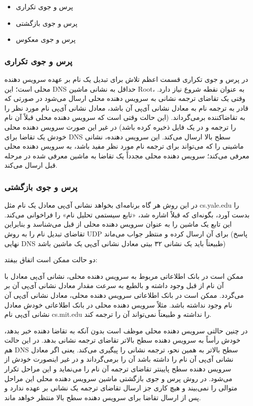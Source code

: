 \documentclass[12pt]{book}
\begin{document}
\begin{itemize}
	\item پرس و جوی تکراری 
	\item پرس و جوی بازگشتی 
	\item پرس و جوی معکوس 
\end{itemize}


\subsubsection{پرس و جوی تکراری}

در پرس و جوی تکراری قسمت اعظم تلاش برای تبدیل یک نام بر عهده سرویس دهنده محلی است؛ این DNS حداقل به نشانی ماشین Root، به عنوان نقطه شروع نیاز دارد. وقتی یک تقاضای ترجمه نشانی به سرویس دهنده محلی ارسال می‌شود در صورتی که قادر به ترجمه نام به معادل نشانی آی‌پی آن باشد، معادل نشانی آی‌پی نام مورد نظر را به تقاضاکننده برمی‌گرداند. (این حالت وقتی است که سرویس دهنده محلی قبلاً آن نام را ترجمه و در یک فایل ذخیره کرده باشد) در غیر این صورت سرویس دهنده محلی خودش یک تقاضا برای DNS سطح بالا ارسال می‌کند. این سرویس دهنده، نشانی ماشینی را که می‌تواند برای ترجمه نام مورد نظر مفید باشد، به سرویس دهنده محلی معرفی می‌کند؛ سرویس دهنده محلی مجدداً یک تقاضا به ماشین معرفی شده در مرحله قبل ارسال می‌کند. 


\subsubsection{پرس و جوی بازگشتی}


در این روش هر گاه برنامه‌ای بخواهد نشانی آی‌پی معادل یک نام مثل cs.yale.edu را بدست آورد، بگونه‌ای که قبلاً اشاره شد، «تابع سیستمی تحلیل نام» را فراخوانی می‌کند. این تابع یک ماشین را به عنوان سرویس دهنده محلی از قبل می‌شناسد و بنابراین تقاضای تبدیل نام را به روش UDP برای آن ارسال کرده و منتظر جواب می‌ماند (پاسخ نهایی DNS طبیعتاً باید یک نشانی ۳۲ بیتی معادل نشانی آی‌پی یک ماشین باشد)

دو حالت ممکن است اتفاق بیفتد:

ممکن است در بانک اطلاعاتی مربوط به سرویس دهنده محلی، نشانی آی‌پی معادل با آن نام از قبل وجود داشته و بالطبع به سرعت مقدار معادل نشانی آی‌پی آن بر می‌گردد. ممکن است در بانک اطلاعاتی سرویس دهنده محلی، معادل نشانی آی‌پی آن نام وجود نداشته باشد. مثلاً سرویس دهنده محلی در بانک اطلاعاتی خودش معادل نشانی آی‌پی نام cs.mit.edu را نداشته و طبیعتاً نمی‌تواند آن را ترجمه کند.

در چنین حالتی سرویس دهنده محلی موظف است بدون آنکه به تقاضا دهنده خبر بدهد، خودش رأساً به سرویس دهنده سطح بالاتر تقاضای ترجمه نشانی بدهد. در این حالت هم DNS سطح بالاتر به همین نحو، ترجمه نشانی را پیگیری می‌کند. یعنی اگر معادل نشانی آی‌پی آن نام را داشته باشد آن را برمی‌گرداند و در غیر اینصورت خودش از سرویس دهنده سطح پایینتر تقاضای ترجمه آن نام را می‌نماید و این مراحل تکرار می‌شود. در روش پرس و جوی بازگشتی ماشین سرویس دهنده محلی این مراحل متوالی را نمی‌بیند و هیچ کاری جز ارسال تقاضای ترجمه یک نشانی بر عهده ندارد و پس از ارسال تقاضا برای سرویس دهنده سطح بالا منتظر خواهد ماند.
\end{document}
